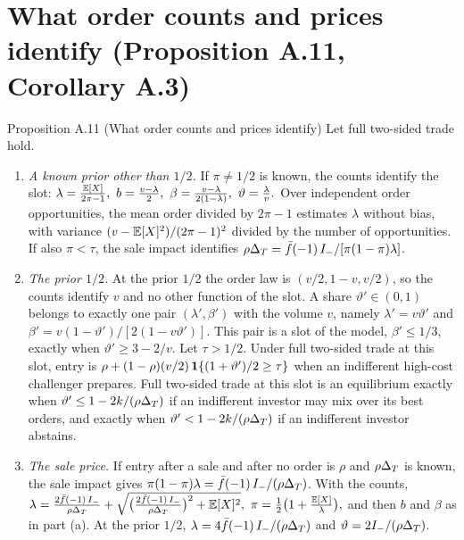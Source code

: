 \section{What order counts and prices identify (Proposition A.11, Corollary A.3)}\label{sec:empirical-identify}

{\small
\begin{paperresult}{Proposition A.11 (What order counts and prices identify)}
Let full two-sided trade hold.
\begin{enumerate}[label=(\alph*),leftmargin=2em,nosep]
\item \emph{A known prior other than \(1/2\).} If \(\pi\ne1/2\) is known, the counts identify the slot:
\(
\lambda=\frac{\E[X]}{2\pi-1},\ b=\frac{v-\lambda}{2},\ \beta=\frac{v-\lambda}{2(1-\lambda)},\ \vartheta=\frac{\lambda}{v}.
\)
Over independent order opportunities, the mean order divided by \(2\pi-1\) estimates \(\lambda\) without bias, with variance \((v-\mathbb{E}[X]^2)/(2\pi-1)^2\) divided by the number of opportunities. If also \(\pi<\tau\), the sale impact identifies \(\rho\Delta_T=\bar f(-1)\,I_-/[\pi(1-\pi)\lambda]\).
\item \emph{The prior \(1/2\).} At the prior \(1/2\) the order law is \((v/2,1-v,v/2)\), so the counts identify \(v\) and no other function of the slot. A share \(\vartheta'\in(0,1)\) belongs to exactly one pair \((\lambda',\beta')\) with the volume \(v\), namely \(\lambda'=v\vartheta'\) and \(\beta'=v(1-\vartheta')/[2(1-v\vartheta')]\). This pair is a slot of the model, \(\beta'\le1/3\), exactly when \(\vartheta'\ge3-2/v\). Let \(\tau>1/2\). Under full two-sided trade at this slot, entry is \(\rho+(1-\rho)(v/2)\,\mathbf{1}\{(1+\vartheta')/2\ge\tau\}\) when an indifferent high-cost challenger prepares. Full two-sided trade at this slot is an equilibrium exactly when \(\vartheta'\le1-2k/(\rho\Delta_T)\) if an indifferent investor may mix over its best orders, and exactly when \(\vartheta'<1-2k/(\rho\Delta_T)\) if an indifferent investor abstains.
\item \emph{The sale price.} If entry after a sale and after no order is \(\rho\) and \(\rho\Delta_T\) is known, the sale impact gives \(\pi(1-\pi)\lambda=\bar f(-1)\,I_-/(\rho\Delta_T)\). With the counts,
\(
\lambda=\frac{2\bar f(-1)\,I_-}{\rho\Delta_T}+\sqrt{\bigl(\frac{2\bar f(-1)\,I_-}{\rho\Delta_T}\bigr)^2+\mathbb{E}[X]^2},\
\pi=\frac12\bigl(1+\frac{\mathbb{E}[X]}{\lambda}\bigr),
\)
and then \(b\) and \(\beta\) as in part (a). At the prior \(1/2\), \(\lambda=4\bar f(-1)\,I_-/(\rho\Delta_T)\) and \(\vartheta=2I_-/(\rho\Delta_T)\).
\end{enumerate}
\end{paperresult}}

